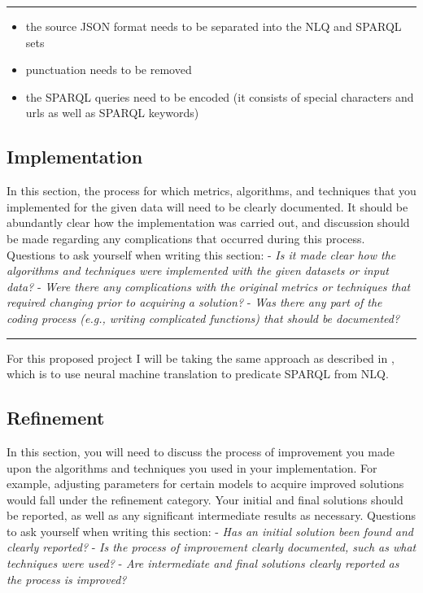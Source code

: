 \documentclass[12pt]{article}
\begin{document}
\begin{center}\rule{0.5\linewidth}{\linethickness}\end{center}

\begin{itemize}
\item
  the source JSON format needs to be separated into the NLQ and SPARQL
  sets
\item
  punctuation needs to be removed
\item
  the SPARQL queries need to be encoded (it consists of special
  characters and urls as well as SPARQL keywords)
\end{itemize}

\subsection{Implementation}\label{implementation}

In this section, the process for which metrics, algorithms, and
techniques that you implemented for the given data will need to be
clearly documented. It should be abundantly clear how the implementation
was carried out, and discussion should be made regarding any
complications that occurred during this process. Questions to ask
yourself when writing this section: - \emph{Is it made clear how the
algorithms and techniques were implemented with the given datasets or
input data?} - \emph{Were there any complications with the original
metrics or techniques that required changing prior to acquiring a
solution?} - \emph{Was there any part of the coding process (e.g.,
writing complicated functions) that should be documented?}

\begin{center}\rule{0.5\linewidth}{\linethickness}\end{center}

For this proposed project I will be taking the same approach as
described in \cite{soru2018neural}, which is to use neural machine
translation to predicate SPARQL from NLQ.

\subsection{Refinement}\label{refinement}

In this section, you will need to discuss the process of improvement you
made upon the algorithms and techniques you used in your implementation.
For example, adjusting parameters for certain models to acquire improved
solutions would fall under the refinement category. Your initial and
final solutions should be reported, as well as any significant
intermediate results as necessary. Questions to ask yourself when
writing this section: - \emph{Has an initial solution been found and
clearly reported?} - \emph{Is the process of improvement clearly
documented, such as what techniques were used?} - \emph{Are intermediate
and final solutions clearly reported as the process is improved?}
\end{document}
